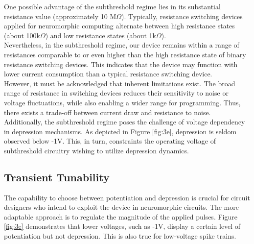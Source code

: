 \noindent One possible advantage of the subthreshold regime lies in its substantial resistance value (approximately 10 M$\Omega$). Typically, resistance switching devices applied for neuromorphic computing alternate between high resistance states (about 100k$\Omega$) and low resistance states (about 1k$\Omega$). \\

\noindent Nevertheless, in the subthreshold regime, our device remains within a range of resistances comparable to or even higher than the high resistance state of binary resistance switching devices. This indicates that the device may function with lower current consumption than a typical resistance switching device.\\

\noindent However, it must be acknowledged that inherent limitations exist. The broad range of resistance in switching devices reduces their sensitivity to noise or voltage fluctuations, while also enabling a wider range for programming. Thus, there exists a trade-off between current draw and resistance to noise. Additionally, the subthreshold regime poses the challenge of voltage dependency in depression mechanisms. As depicted in Figure \ref{fig:3e}, depression is seldom observed below -1V. This, in turn, constraints the operating voltage of subthreshold circuitry wishing to utilize depression dynamics.\\


\subsection[Transient Tunability]{Transient Tunability}

The capability to choose between potentiation and depression is crucial for circuit designers who intend to exploit the device in neuromorphic circuits. The more adaptable approach is to regulate the magnitude of the applied pulses. Figure \ref{fig:3e} demonstrates that lower voltages, such as -1V, display a certain level of potentiation but not depression. This is also true for low-voltage spike trains.\\

